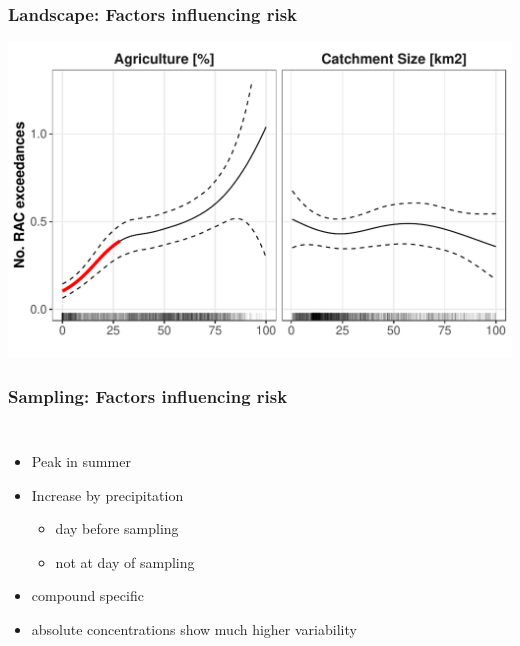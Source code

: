 \documentclass[
	10pt
	]{beamer}
\begin{document}
\begin{frame}
\frametitle{Landscape: Factors influencing risk}
	\includegraphics[width = 1\textwidth]{figs/agri_size_eff.pdf}
\end{frame}

\begin{frame}
\frametitle{Sampling: Factors influencing risk}
	\begin{columns}
			\resizebox{1.1\textwidth}{!}{%
				}
	    	\begin{itemize}
	    		\item Peak in summer
	    		\item Increase by \alert{precipitation}
			    	\begin{itemize}		
			    		\item day before sampling
			    		\item not at day of sampling
			    	\end{itemize}	
	    		\item compound specific
	    		\item absolute concentrations show much higher variability
	    	\end{itemize}
	\end{columns}
\end{frame}
\end{document}
